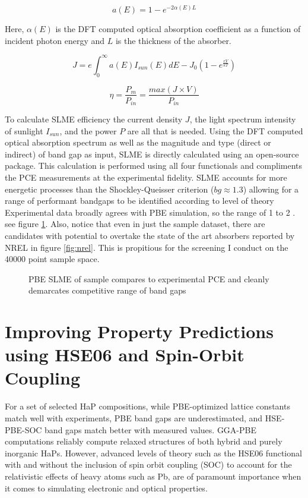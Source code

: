 \[
\label{eq:absorption_alpha}
a(E)=1-e^{-2\alpha(E)L}
\]

Here, \(\alpha(E)\) is the DFT computed optical absorption coefficient
as a function of incident photon energy and \(L\) is the thickness of
the absorber.

\[
\label{eq:slme_int}
J=e\int_{0}^{\infty} a(E)I_{sun}(E)dE - J_{0}(1-e^{\frac{eV}{kT}})
\]

\[
\label{eq:slme_sum}
\eta = \frac{P_{m}}{P_{in}}=\frac{max(J \times V)}{P_{in}}
\]

To calculate SLME efficiency the current density \(J\), the light spectrum intensity of sunlight \(I_{sun}\), and the power \(P\) are all that is needed.
Using the DFT computed optical absorption spectrum as well as the magnitude and type (direct or indirect) of band gap as input, SLME is directly calculated using an open-source package.
\autocite{williams-2022-sl3me}
This calculation is performed using all four functionals and compliments the PCE measurements at the experimental fidelity.
SLME accounts for more energetic processes than the Shockley-Queisser criterion (\(bg \approx 1.3\)) allowing for a range of performant bandgaps to be identified according to level of theory\autocite[p.1]{yu-2012-ident-poten}
Experimental data\autocite{almora-2020-devic-perfor} broadly agrees with PBE simulation, so the range of 1 to 2 \units{\electronvolts}.
see figure \ref{fig:slme}.
Also, notice that even in just the sample dataset, there are candidates with potential to overtake the state of the art absorbers reported by NREL in figure \ref{fig:nrel}.
This is propitious for the screening I conduct on the 40000 point sample space.

 
\begin{figure}[htbp]
\centering

\caption{\label{fig:slme} PBE SLME of sample compares to experimental PCE and cleanly demarcates competitive range of band gaps}
\end{figure}

\section{Improving Property Predictions using HSE06 and Spin-Orbit Coupling}
\label{sec:orgdf149b2}
For a set of selected HaP compositions, while PBE-optimized lattice constants match well with experiments, PBE band gaps are underestimated, and HSE-PBE-SOC band gaps match better with measured values.
GGA-PBE computations reliably compute relaxed structures of both hybrid and purely inorganic HaPs.
However, advanced levels of theory such as the HSE06 functional with and without the inclusion of spin orbit coupling (SOC) to account for the relativistic effects of heavy atoms such as Pb, are of paramount importance when it comes to simulating electronic and optical properties.

